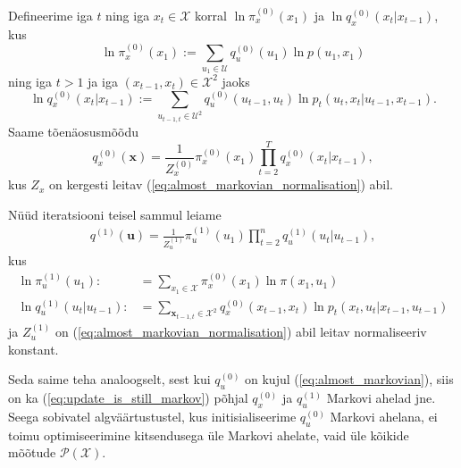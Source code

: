 Defineerime iga $t$ ning iga $x_t \in \mathcal{X}$ korral $\ln \pi_x^{(0)}(x_1)$ ja $\ln q_x^{(0)}(x_t | x_{t-1})$, kus
$$\ln \pi_x^{(0)}(x_1) := \sum_{u_1 \in \mathcal{U}}  q_u^{(0)}(u_1) \ln p(u_1,x_1)$$
ning iga $t > 1$ ja iga $(x_{t-1}, x_t) \in \mathcal{X}^2$ jaoks
$$\ln q_x^{(0)}(x_{t}|x_{t-1}) := \sum_{u_{t-1,t} \in \mathcal{U}^2}  q_u^{(0)}(u_{t-1}, u_t) \ln p_t(u_{t},x_t | u_{t-1},x_{t-1}).$$ 
Saame tõenäosusmõõdu
\begin{equation}
    \label{eq:update_is_still_markov}
    q_x^{(0)}(\bm{x}) = \frac{1}{Z_x^{(0)}}\pi_x^{(0)}(x_1)\prod_{t=2}^T q_x^{(0)}(x_t | x_{t-1}),
\end{equation}
kus $Z_x$ on kergesti leitav (\ref{eq:almost_markovian_normalisation}) abil.

Nüüd iteratsiooni teisel sammul leiame
\begin{align*}
    q^{(1)}(\bm{u}) = \frac{1}{Z_u^{(1)}}\pi_u^{(1)}(u_1) \prod_{t=2}^n q_u^{(1)}(u_t | u_{t-1}),
\end{align*}
kus 
\begin{align*}
    \ln \pi_u^{(1)}(u_1) :&= \sum_{x_1 \in \mathcal{X}}  \pi_x^{(0)}(x_1) \ln \pi(x_1,u_1) \\
    \ln q_u^{(1)}(u_{t}|u_{t-1}) :&= \sum_{\bm{x}_{t-1,t} \in \mathcal{X}^2}  q_x^{(0)}(x_{t-1}, x_t) \ln p_t(x_{t},u_t | x_{t-1},u_{t-1})
\end{align*}
ja $Z_u^{(1)}$ on (\ref{eq:almost_markovian_normalisation}) abil leitav normaliseeriv konstant.

Seda saime teha analoogselt, sest kui $q_u^{(0)}$ on kujul (\ref{eq:almost_markovian}), siis on ka (\ref{eq:update_is_still_markov}) põhjal $q_x^{(0)}$ ja $q_u^{(1)}$ Markovi ahelad jne. 
Seega sobivatel algväärtustustel, kus initisialiseerime $q_u^{(0)}$ Markovi ahelana, ei toimu optimiseerimine kitsendusega üle Markovi ahelate, vaid üle kõikide mõõtude $\mathcal{P}(\mathcal{X})$.  

